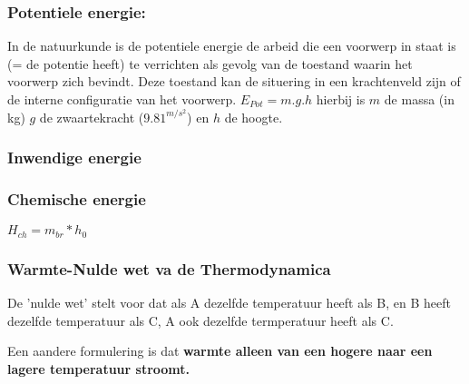 \documentclass[12pt]{article}
\begin{document}
\subsubsection{Potentiele energie:}
In de natuurkunde is de potentiele energie de arbeid die een voorwerp in staat is (= de potentie heeft) te verrichten als gevolg van de toestand waarin het voorwerp zich bevindt. Deze toestand kan de situering in een krachtenveld zijn of de interne configuratie van het voorwerp. $E_{Pot}= m.g.h$  hierbij is $m$ de massa (in kg) $g$ de zwaartekracht ($9.81^{m/s^2}$) en $h$ de hoogte.
\subsubsection{Inwendige energie}
\subsubsection{Chemische energie}
$H_{ch}=m_{br}*h_{0}$
\subsubsection{Warmte-Nulde wet va de Thermodynamica}
De 'nulde wet' stelt voor dat als A dezelfde temperatuur heeft als B, en B heeft dezelfde temperatuur als C, A ook dezelfde termperatuur heeft als C.

Een aandere formulering is dat \textbf{warmte alleen van een hogere naar een lagere temperatuur stroomt.}
\end{document}
